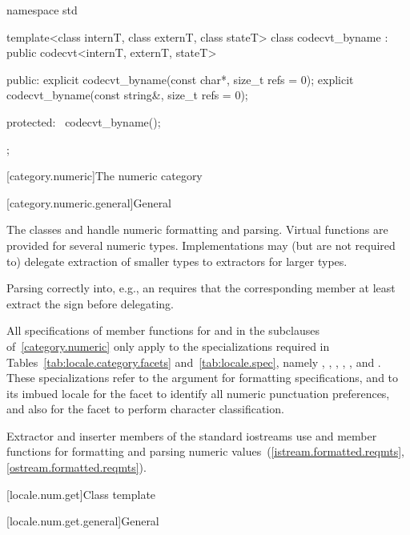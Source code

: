 %
\begin{codeblock}
namespace std {
  template<class internT, class externT, class stateT>
    class codecvt_byname : public codecvt<internT, externT, stateT> {
    public:
      explicit codecvt_byname(const char*, size_t refs = 0);
      explicit codecvt_byname(const string&, size_t refs = 0);

    protected:
      ~codecvt_byname();
    };
}
\end{codeblock}

[category.numeric]{The numeric category}

[category.numeric.general]{General}

\pnum
The classes  and 
handle numeric formatting and parsing.
Virtual functions are provided for several numeric types.
Implementations may (but are not required to) delegate
extraction of smaller types to extractors for larger types.
\begin{footnote}
Parsing  correctly into, e.g., an 
requires that the corresponding member 
at least extract the sign before delegating.
\end{footnote}

\pnum
All specifications of member functions for  and 
in the subclauses of~\ref{category.numeric} only apply to
the specializations required in Tables~\ref{tab:locale.category.facets}
and~\ref{tab:locale.spec}, namely
,
,
,
,
, and
.
These specializations refer to the  argument for
formatting specifications,
and to its imbued locale for the  facet to
identify all numeric punctuation preferences,
and also for the  facet to perform character classification.

\pnum
Extractor and inserter members of the standard iostreams use
 and  member functions for
formatting and parsing
numeric values~(\ref{istream.formatted.reqmts}, \ref{ostream.formatted.reqmts}).

[locale.num.get]{Class template }

[locale.num.get.general]{General}


